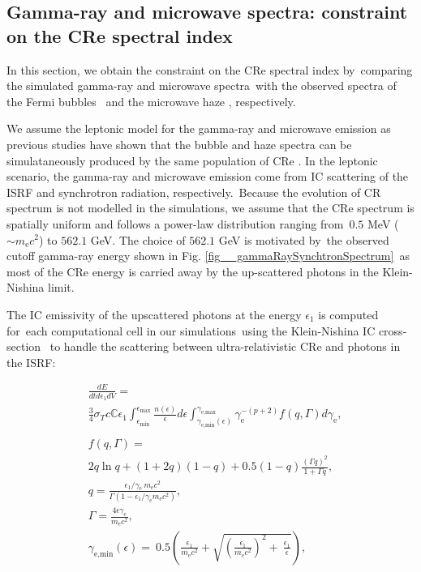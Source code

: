 \documentclass[fleqn,usenatbib,useAMS]{mnras}
\begin{document}
\subsection{Gamma-ray and microwave spectra: constraint on the CRe spectral index}
\label{sec:gamma-ray-microwave}
In this section, we obtain the constraint on the CRe spectral index by\
comparing the simulated gamma-ray and microwave spectra\
with the observed spectra of the Fermi bubbles \citep{Ackermann2014}\
and the microwave haze \citep{Dobler_2008}, respectively.\

We assume the leptonic model for the gamma-ray and microwave emission as previous studies have shown that the bubble and haze spectra can be simulataneously produced by the same population of CRe \citep{Su2010, Ackermann2014, Yang2022}. In the leptonic scenario, the gamma-ray and microwave emission come from IC scattering of the ISRF and synchrotron radiation, respectively.\
Because the evolution of CR spectrum is not modelled in the simulations, we assume that the CRe spectrum is spatially uniform and follows a power-law distribution ranging from\
$0.5$ MeV ($\sim m_{\text{e}}c^2$) to $562.1$ GeV. The choice of $562.1$ GeV is motivated by\
the observed cutoff gamma-ray energy shown in Fig. \ref{fig__gammaRaySynchtronSpectrum}\
as most of the CRe energy is carried away by the up-scattered photons in the Klein-Nishina limit.


The IC emissivity of the upscattered photons at the energy $\epsilon_{1}$ is computed for\
each computational cell in our simulations\
using the Klein-Nishina IC cross-section \citep{Jones1968,BLUMENTHAL1970}\
to handle the scattering between ultra-relativistic CRe and photons in the ISRF:

\begin{subequations}
  \begin{align}
  &\frac{dE}{dtd\epsilon_{1}dV} =\nonumber\\
               &\frac{3}{4}\sigma_{T}c\mathbb{C}\epsilon_{1}\int^{\epsilon_{\text{max}}}_{\epsilon_{\text{min}}}
               \frac{n(\epsilon)}{\epsilon}d\epsilon\int^{\gamma_{\text{e,max}}}_{\gamma_{\text{e,min}}\left(\epsilon\right)}
               \gamma_{\text{e}}^{-(p+2)}f(q, \Gamma)d\gamma_{\text{e}},\\
  \nonumber\\
  &f(q, \Gamma) =\nonumber\\
               &2q\ln q+(1+2q)(1-q)+0.5(1-q)\frac{\left(\Gamma q\right)^2}{1+\Gamma q},\\
  &q=\frac{\epsilon_{1}/\gamma_{\text{e}}\
               m_{\text{e}}c^{2}}{\Gamma\left(1-\epsilon_{1}/\gamma_{\text{e}} m_{\text{e}}c^{2}\right)},\\
  &\Gamma=\frac{4\epsilon \gamma_{\text{e}}}{m_{\text{e}}c^2},\\
  &\gamma_{\text{e,min}}(\epsilon)=\
   0.5\left(\frac{\epsilon_{1}}{m_{\text{e}}c^2}+\sqrt{\left(\frac{\epsilon_{1}}{m_{\text{e}}c^2}\right)^2+\
   \frac{\epsilon_{1}}{\epsilon}}\right) \label{gamma-min},
  \end{align}
\label{gammaray-emissivity}
\end{subequations}
\end{document}
